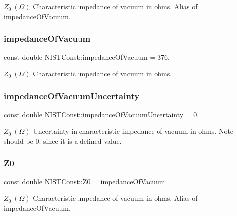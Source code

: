 $Z_0 \ (\Omega)$ Characteristic impedance of vacuum in ohms. Alias of impedance\+Of\+Vacuum. \mbox{\label{group___impedance_of_vacuum_ga51e1aede5d89041ea7423522b526dd0e}} 
\subsubsection{\texorpdfstring{impedance\+Of\+Vacuum}{impedanceOfVacuum}}
{\footnotesize\ttfamily const double N\+I\+S\+T\+Const\+::impedance\+Of\+Vacuum = 376.}

$Z_0 \ (\Omega)$ Characteristic impedance of vacuum in ohms. \mbox{\label{group___impedance_of_vacuum_ga0d686b0016dc8c1f0bda161283b4f9c5}} 
\subsubsection{\texorpdfstring{impedance\+Of\+Vacuum\+Uncertainty}{impedanceOfVacuumUncertainty}}
{\footnotesize\ttfamily const double N\+I\+S\+T\+Const\+::impedance\+Of\+Vacuum\+Uncertainty = 0.}

$Z_0 \ (\Omega)$ Uncertainty in characteristic impedance of vacuum in ohms. Note should be 0. since it is a defined value. \mbox{\label{group___impedance_of_vacuum_ga0de5c47b3a38d72c61aac5574ea154ca}} 
\subsubsection{\texorpdfstring{Z0}{Z0}}
{\footnotesize\ttfamily const double N\+I\+S\+T\+Const\+::\+Z0 = impedance\+Of\+Vacuum}

$Z_0 \ (\Omega)$ Characteristic impedance of vacuum in ohms. Alias of impedance\+Of\+Vacuum. 